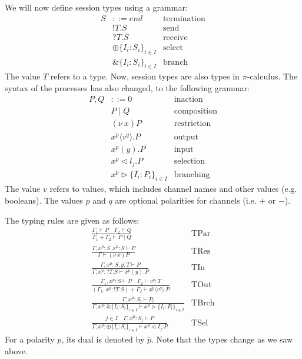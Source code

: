 \documentclass[a4paper, openany]{memoir}
\theoremstyle{definition}
\begin{document}
    We will now define session types using a grammar:
    \begin{align*}
        S &::= \textit{end} & \textrm{termination} \\
        & !T.S & \textrm{send} \\
        &?T.S & \textrm{receive} \\
        &\oplus \{I_i \colon S_i\}_{i \in I} & \textrm{select} \\
        &\& \{I_i \colon S_i\}_{i \in I} & \textrm{branch} 
    \end{align*}
    The value $T$ refers to a type. Now, session types are also types in $\pi$-calculus. The syntax of the processes has also changed, to the following grammar:
    \begin{align*}
        P, Q &::= 0 & \textrm{inaction} \\
        & P \mid Q & \textrm{composition} \\
        & (\nu \ x)P & \textrm{restriction} \\
        & \overline{x^p} \langle v^q \rangle.P & \textrm{output} \\
        & x^p (y).P & \textrm{input} \\
        & x^p \vartriangleleft l_j.P & \textrm{selection} \\
        & x^p \vartriangleright \{I_i \colon P_i\}_{i \in I} & \textrm{branching}
    \end{align*}
    The value $v$ refers to values, which includes channel names and other values (e.g. booleans). The values $p$ and $q$ are optional polarities for channels (i.e. $+$ or $-$).

    The typing rules are given as follows:
    \begin{align*}
        \frac{\Gamma_1 \vdash P \quad \Gamma_2 \vdash Q}{\Gamma_1 + \Gamma_2 \vdash P \mid Q} & \textrm{TPar} \\
        \frac{\Gamma, x^p \colon S, x^{\overline{p}} \colon \overline{S} \vdash P}{\Gamma \vdash (\nu \ x)P} & \textrm{TRes} \\
        \frac{\Gamma, x^p \colon S, y \colon T \vdash P}{\Gamma, x^p \colon ?T.S \vdash x^p(y).P} &\textrm{TIn} \\
        \frac{\Gamma_1, x^p \colon S \vdash P \quad \Gamma_2 \vdash v^q \colon T}{(\Gamma_1, x^p \colon !T.S) + \Gamma_2 \vdash \overline{x^p} \langle v^q \rangle.P} &\textrm{TOut} \\
        \frac{\Gamma, x^p \colon S_i \vdash P_i}{\Gamma, x^p \colon \& \{I_i \colon S_i\}_{i \in I} \vdash x^p \vartriangleright \{I_i \colon P_i\}_{i \in I}} & \textrm{TBrch} \\
        \frac{j \in I \quad \Gamma, x^p \colon S_j \vdash P}{\Gamma, x^p \colon \oplus \{I_i \colon S_i\}_{i \in I} \vdash x^p \vartriangleleft I_j.P} & \textrm{TSel}
    \end{align*}
    For a polarity $p$, its dual is denoted by $\overline{p}$. Note that the types change as we saw above.
\end{document}

